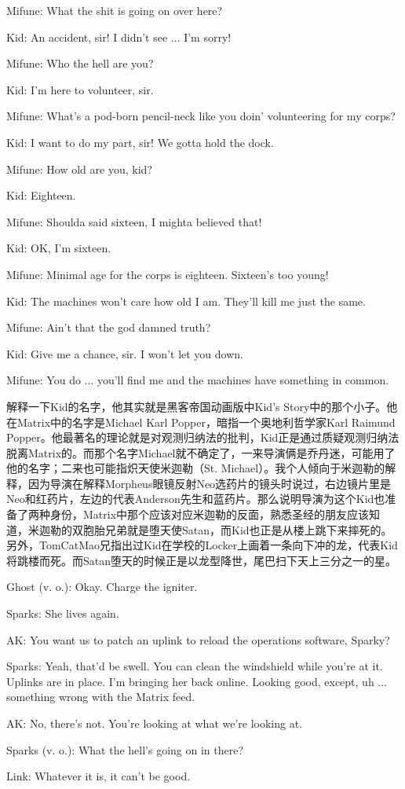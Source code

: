 \documentclass[UTF8]{ctexart}
\newenvironment{myquote}{\color{green} \setlength{\leftskip}{6em} \setlength{\rightskip}{4em} \setlength{\parindent}{-2em}}{\par}
\begin{document}
\begin{myquote}
Mifune: What the shit is going on over here?

Kid: An accident, sir! I didn't see ... I'm sorry!

Mifune: Who the hell are you?

Kid: I'm here to volunteer, sir.

Mifune: What's a pod-born pencil-neck like you doin' volunteering for my corps?

Kid: I want to do my part, sir! We gotta hold the dock.

Mifune: How old are you, kid?

Kid: Eighteen.

Mifune: Shoulda said sixteen, I mighta believed that!

Kid: OK, I'm sixteen.

Mifune: Minimal age for the corps is eighteen. Sixteen's too young!

Kid: The machines won't care how old I am. They'll kill me just the same.

Mifune: Ain't that the god damned truth?

Kid: Give me a chance, sir. I won't let you down.

Mifune: You do ... you'll find me and the machines have something in common.
\end{myquote}

解释一下Kid的名字，他其实就是黑客帝国动画版中Kid's Story中的那个小子。他在Matrix中的名字是Michael Karl Popper，暗指一个奥地利哲学家Karl Raimund Popper。他最著名的理论就是对观测归纳法的批判，Kid正是通过质疑观测归纳法脱离Matrix的。而那个名字Michael就不确定了，一来导演俩是乔丹迷，可能用了他的名字；二来也可能指炽天使米迦勒（St. Michael）。我个人倾向于米迦勒的解释，因为导演在解释Morpheus眼镜反射Neo选药片的镜头时说过，右边镜片里是Neo和红药片，左边的代表Anderson先生和蓝药片。那么说明导演为这个Kid也准备了两种身份，Matrix中那个应该对应米迦勒的反面，熟悉圣经的朋友应该知道，米迦勒的双胞胎兄弟就是堕天使Satan，而Kid也正是从楼上跳下来摔死的。另外，TomCatMao兄指出过Kid在学校的Locker上画着一条向下冲的龙，代表Kid将跳楼而死。而Satan堕天的时候正是以龙型降世，尾巴扫下天上三分之一的星。

\begin{myquote}
Ghost (v. o.): Okay. Charge the igniter.

Sparks: She lives again.

AK: You want us to patch an uplink to reload the operations software, Sparky?

Sparks: Yeah, that'd be swell. You can clean the windshield while you're at it. Uplinks are in place. I'm bringing her back online. Looking good, except, uh ... something wrong with the Matrix feed.

AK: No, there's not. You're looking at what we're looking at.

Sparks (v. o.): What the hell's going on in there?

Link: Whatever it is, it can't be good.
\end{myquote}
\end{document}
